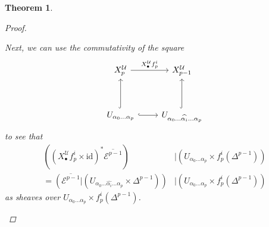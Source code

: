 \documentclass[11pt,fleqn]{article}
\theoremstyle{plain}
\newtheorem{theorem}{Theorem}[subsection]
\theoremstyle{definition}
\theoremstyle{remark}
\numberwithin{equation}{theorem}
\newcommand{\cover}{\mathcal{U}}
\newcommand{\restricted}{\mathbin{\big\vert}}
\newcommand{\id}{\mathrm{id}}
\newcommand{\nerve}[1]{X_{#1}^\cover}
\begin{document}
\begin{theorem}
\begin{proof}
\begin{enumerate}
                        Next, we can use the commutativity of the square
                        \begin{equation}
                        \label{equation:square-for-pullback-restriction-equality}
                            \begin{tikzcd}[row sep=huge]
                                \nerve{p}
                                    \ar[r,"\nerve{\bullet}f_p^i"]
                                & \nerve{p-1}\\
                                U_{\alpha_0\ldots\alpha_p}
                                    \ar[r,hook]
                                    \ar[u,hook]
                                & U_{\alpha_0\ldots\widehat{\alpha_i}\ldots\alpha_p}
                                    \ar[u,hook]
                            \end{tikzcd}
                        \end{equation}
                        to see that
                        \begin{align*}
                            \left(\left(\nerve{\bullet}f_p^i\times\id\right)^* \overline{\mathcal{E}^{p-1}}\right) &\restricted \left(U_{\alpha_0\ldots\alpha_p}\times f_p^i(\Delta^{p-1})\right)\\
                            =
                            \left(\overline{\mathcal{E}^{p-1}} \restricted \left(U_{\alpha_0\ldots\widehat{\alpha_i}\ldots\alpha_p}\times\Delta^{p-1}\right)\right) &\restricted \left(U_{\alpha_0\ldots\alpha_p}\times f_p^i(\Delta^{p-1})\right)
                        \end{align*}
                        as sheaves over $U_{\alpha_0\ldots\alpha_p}\times f_p^i(\Delta^{p-1})$.


\end{enumerate}
\end{proof}
\end{theorem}
\end{document}
